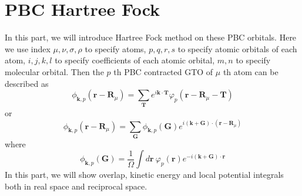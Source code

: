 \documentclass{article}
\begin{document}
\section{PBC Hartree Fock}
    In this part, we will introduce Hartree Fock method on these PBC orbitals.
    Here we use index $\mu,\nu,\sigma,\rho$ to specify atoms,
    $p,q,r,s$ to specify atomic orbitals of each atom,
    $i,j,k,l$ to specify coefficients of each atomic orbital,
    $m,n$ to specify molecular orbital.
    Then the $p$ th PBC contracted GTO of $\mu$ th atom can be described as
    \begin{equation}
        \phi_{\textbf{k},p}(\textbf{r}-\textbf{R}_{\mu}) = \sum_{\textbf{T}}e^{i\textbf{k}\cdot\textbf{T}}\varphi_p(\textbf{r}-\textbf{R}_{\mu}-\textbf{T})
    \end{equation}
    or 
    \begin{equation}
        \phi_{\textbf{k},p}(\textbf{r}-\textbf{R}_{\mu}) = \sum_{\textbf{G}}\phi_{\textbf{k},p}(\textbf{G})e^{i(\textbf{k}+\textbf{G})\cdot(\textbf{r}-\textbf{R}_{\mu})}
    \end{equation}
    where
    \begin{equation}
        \phi_{\textbf{k},p}(\textbf{G}) = \frac{1}{\Omega}\int d\textbf{r}\ \varphi_p(\textbf{r})e^{-i(\textbf{k}+\textbf{G})\cdot\textbf{r}}
    \end{equation}
    In this part, we will show overlap, kinetic energy and local potential integrals both in real space and reciprocal space.

\end{document}
